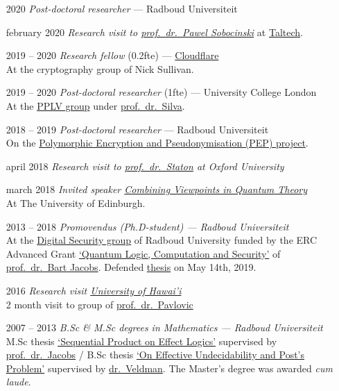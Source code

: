 \documentclass{article}
\newcommand\hsep{ {\color{gray}/} }
\newcommand\partitle[1]{\vskip20pt\par\noindent{\textsf{\textbf{#1}}}}
\begin{document}
\partitle{Academic career}
\begin{itemize}
    \item[2020] \emph{Post-doctoral researcher} --- Radboud Universiteit
    \item[february 2020] \emph{Research visit to
        \href{https://www.ioc.ee/~pawel/}{prof.~dr.~Pawel Sobocinski}}
            at \href{https://www.taltech.ee}{Taltech}.
    \item[2019 -- 2020] \emph{Research fellow} (0.2fte) --- 
        \href{https://cloudflare.com}{Cloudflare} \\
        At the cryptography group of Nick Sullivan.
    \item[2019 -- 2020] \emph{Post-doctoral researcher} (1fte) --- University
        College London\\
        At the \href{http://pplv.cs.ucl.ac.uk/welcome/}{PPLV group}
            under \href{https://alexandrasilva.org/#/main.html}{prof.~dr.~Silva}.
    \item[2018 -- 2019] \emph{Post-doctoral researcher} --- Radboud Universiteit\\
        On the \href{https://pep.cs.ru.nl}{Polymorphic Encryption and Pseudonymisation (PEP) project}.
    \item[april 2018] \emph{Research visit to \href{http://www.cs.ox.ac.uk/people/samuel.staton/main.html}{prof.~dr.~Staton} at Oxford University}
    \item[march 2018] \emph{Invited speaker \href{http://homepages.inf.ed.ac.uk/cheunen/cvqt/}{Combining Viewpoints in Quantum Theory}}\\
        At The University of Edinburgh.
    \item[2013 -- 2018]  \emph{Promovendus (Ph.D-student) ---
        Radboud Universiteit}\\
        At the \href{http://www.ru.nl/ds/}{Digital Security group}
        of Radboud University funded by
        the ERC Advanced Grant \href{https://cordis.europa.eu/project/rcn/107285_en.html}{`Quantum Logic, Computation and Security'}
        of \href{http://www.cs.ru.nl/B.Jacobs/}{prof.~dr.~Bart Jacobs}.
            Defended
            \href{http://westerbaan.name/~bas/thesis.pdf}{thesis}
            on May 14th, 2019.
    \item[2016] \emph{Research visit \href{http://manoa.hawaii.edu}{University of Hawai'i}}\\
        2 month visit to group of \href{http://dusko.org}{prof.~dr.~Pavlovic}
    \item[2007 -- 2013] \emph{B.Sc \& M.Sc degrees in Mathematics ---
                Radboud Universiteit} \\
        M.Sc thesis \href{www.ru.nl/publish/pages/813276/masterscriptie_bas_westerbaan.pdf}{`Sequential Product on Effect Logics'}
            supervised by \href{http://www.cs.ru.nl/B.Jacobs/}{prof.~dr.~Jacobs} \hsep
        B.Sc thesis \href{https://arxiv.org/abs/1409.1030}{`On Effective Undecidability and Post's Problem'}
            supervised by \href{http://www.ru.nl/wiskunde/@1039532/veldman-dhr-dr-(wim)/}{dr.~Veldman}.
        The Master's degree was awarded \emph{cum laude}.
\end{itemize}
\end{document}
